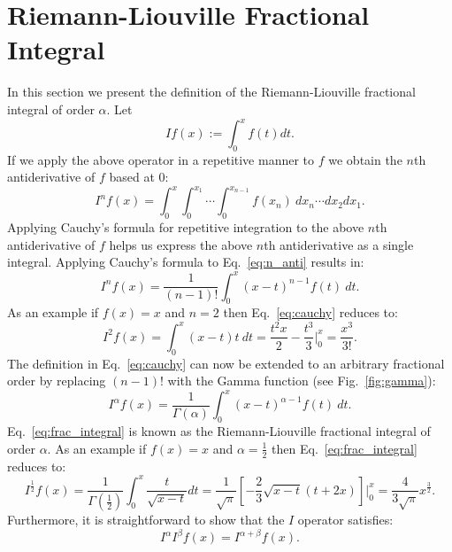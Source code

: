\documentclass{article}
\theoremstyle{theorem}
\theoremstyle{definition}
\begin{document}
\section{Riemann-Liouville Fractional Integral}
In this section we present the definition of the Riemann-Liouville fractional integral of order $\alpha$. Let
\begin{equation}
If(x) := \int_0^x f(t) dt.
\end{equation}
If we apply the above operator in a repetitive manner to $f$ we obtain the $n$th antiderivative of $f$ based at 0:
\begin{equation}
\label{eq:n_anti}
I^nf(x) = \int_0^x\int_0^{x_1}\cdots \int_0^{x_{n-1}}f(x_n)~dx_n\cdots dx_2 dx_1.
\end{equation}
Applying Cauchy's formula for repetitive integration to the above $n$th antiderivative of $f$ helps us express the above $n$th antiderivative as a single integral. 
Applying Cauchy's formula to Eq.~\eqref{eq:n_anti} results in:
\begin{equation}
\label{eq:cauchy}
I^nf(x) = \frac{1}{(n-1)!}\int_0^x (x-t)^{n-1}f(t)~dt.
\end{equation}
As an example if $f(x)=x$ and $n=2$ then Eq.~\eqref{eq:cauchy} reduces to:
\begin{equation}
I^2f(x) = \int_0^x (x-t)t~dt = \frac{t^2x}{2} - \frac{t^3}{3} \Bigg |_0^x = \frac{x^3}{3!}.
\end{equation}
The definition in Eq.~\eqref{eq:cauchy} can now be extended to an arbitrary fractional order by replacing $(n-1)!$ with the Gamma function (see Fig.~\ref{fig:gamma}):
\begin{equation}
\label{eq:frac_integral}
I^{\alpha}f(x) = \frac{1}{\Gamma(\alpha)}\int_0^x (x-t)^{\alpha-1}f(t)~dt.
\end{equation}
Eq.~\eqref{eq:frac_integral} is known as the Riemann-Liouville fractional integral of order $\alpha$. As an example if $f(x)=x$ and $\alpha=\frac{1}{2}$ then 
Eq.~\eqref{eq:frac_integral} reduces to:
\begin{equation}
I^{\frac{1}{2}}f(x) = \frac{1}{\Gamma(\frac{1}{2})} \int_0^x \frac{t}{\sqrt{x-t}} dt = \frac{1}{\sqrt{\pi}}\left [ -\frac{2}{3}\sqrt{x-t}(t+2x)\right] \Bigg |_0^x=\frac{4}{3\sqrt{\pi}}x^{\frac{3}{2}}. 
\end{equation}
Furthermore, it is straightforward to show that the $I$ operator satisfies:
\begin{equation}
I^{\alpha}I^{\beta}f(x) = I^{\alpha+\beta}f(x). 
\end{equation}
\end{document}
